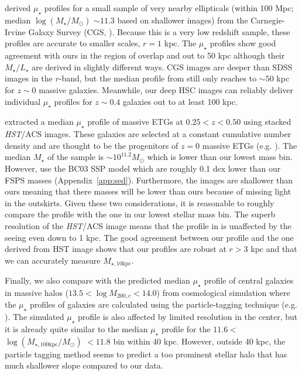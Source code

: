 \documentclass[a4paper,fleqn,usenatbib]{mnras}
\def\mstar{{$M_{\star}$}}
\def\logms{{$\log (M_{\star}/M_{\odot})$}}
\def\minn{{$M_{\star,10\mathrm{kpc}}$}}
\def\logmtot{{$\log (M_{\star,100\mathrm{kpc}}/M_{\odot})$}}
\def\m2l{{$M_{\star}/L_{\star}$}}
\def\mden{{$\mu_{\star}$}}
\begin{document}
    \citet{Huang2013a} derived \mden{} profiles for a small sample of very nearby 
    ellipticals (within 100 Mpc; median \logms{} ${\sim} 11.3$ based on shallower 
    images) from the Carnegie-Irvine Galaxy Survey (CGS, \citealt{CGS1}). 
    Because this is a very low redshift sample, these profiles are accurate to 
    smaller scales, $r=1$ kpc. 
    The \citet{Huang2013a} \mden{} profiles show good agreement with ours in the 
    region of overlap and out to 50 kpc although their \m2l{} are derived in 
    slightly different ways.
    CGS images are deeper than SDSS images in the $r$-band, but the median 
    profile from \citet{Huang2013a} still only reaches to ${\sim} 50$ kpc for $z{\sim} 0$ 
    massive galaxies.
    Meanwhile, our deep HSC images can reliably deliver individual \mden{} profiles 
    for $z{\sim} 0.4$ galaxies out to at least 100 kpc.  
    
    \citet{Patel2013} extracted a median \mden{} profile of massive ETGs at 
    $0.25 < z < 0.50$ using stacked \textit{HST}/ACS images. 
    These galaxies are selected at a constant cumulative number density and are 
    thought to be the progenitors of $z=0$ massive ETGs (e.g. \citealt{Leja2013}).  
    The median \mstar{} of the \citet{Patel2013} sample is 
    ${\sim} 10^{11.2} M_{\odot}$ which is lower than our lowest mass bin. 
    However, \citet{Patel2013} use the BC03 SSP model which are roughly 0.1 dex 
    lower than our FSPS masses (Appendix~\ref{app:sed}). 
    Furthermore, the \citet{Patel2013} images are shallower than ours meaning 
    that there masses will be lower than ours because of missing light in the 
    outskirts. 
    Given these two considerations, it is reasonable to roughly compare the 
    \citet{Patel2013} profile with the one in our lowest stellar mass bin. 
    The superb resolution of the \textit{HST}/ACS image means that the profile in
    \citet{Patel2013} is unaffected by the seeing even down to 1 kpc. 
    The good agreement between our profile and the one derived from HST image 
    shows that our profiles are robust at $r > 3$ kpc and that we can accurately 
    measure \minn{}.
    
    Finally, we also compare with the predicted median \mden{} profile of central 
    galaxies in massive halos ($13.5 < \log M_{200,c} < 14.0$) from cosmological 
    simulation where the \mden{} profiles of galaxies are calculated using the 
    particle-tagging technique (e.g. \citealt{Cooper2010}). 
    The simulated \mden{} profile is also affected by limited resolution in the 
    center, but it is already quite similar to the median \mden{} profile for 
    the $11.6 <$ \logmtot{} $< 11.8$ bin within 40 kpc. 
    However, outside 40 kpc, the particle tagging method seems to predict a too 
    prominent stellar halo that has much shallower slope compared to our data.
    
\end{document}
